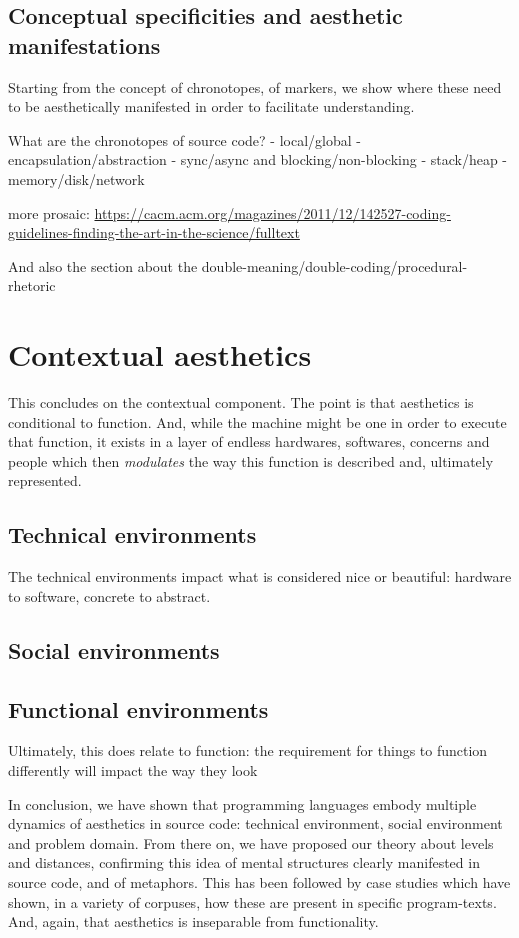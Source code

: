 \subsection{Conceptual specificities and aesthetic manifestations} %
\label{subsec:conceptual-specificities}

Starting from the concept of chronotopes, of markers, we show where these need to be aesthetically manifested in order to facilitate understanding.

What are the chronotopes of source code?
- local/global
- encapsulation/abstraction
- sync/async and blocking/non-blocking
- stack/heap
- memory/disk/network

more prosaic: \url{https://cacm.acm.org/magazines/2011/12/142527-coding-guidelines-finding-the-art-in-the-science/fulltext}

And also the section about the double-meaning/double-coding/procedural-rhetoric

\section{Contextual aesthetics} %
\label{sec:contextual-aesthetics}

This concludes on the contextual component. The point is that aesthetics is conditional to function. And, while the machine might be one in order to execute that function, it exists in a layer of endless hardwares, softwares, concerns and people which then \emph{modulates} the way this function is described and, ultimately represented.

\subsection{Technical environments}
\label{subsec:technical-environments}

The technical environments impact what is considered nice or beautiful: hardware to software, concrete to abstract.

\subsection{Social environments}
\label{subsec:social-environments}

\subsection{Functional environments}
\label{subsec:functional-environments}

Ultimately, this does relate to function: the requirement for things to function differently will impact the way they look

\spacer


In conclusion, we have shown that programming languages embody multiple dynamics of aesthetics in source code: technical environment, social environment and problem domain. From there on, we have proposed our theory about levels and distances, confirming this idea of mental structures clearly manifested in source code, and of metaphors. This has been followed by case studies which have shown, in a variety of corpuses, how these are present in specific program-texts. And, again, that aesthetics is inseparable from functionality.